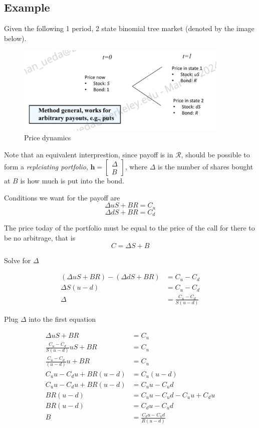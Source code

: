 \documentclass[11pt]{article}
\begin{document}
\subsection{Example}

Given the following 1 period, 2 state binomial tree market (denoted by the image below).

\begin{figure}[H] 
    \centering 
    \includegraphics[width=4in]{imgs/one_period_two_state_bin_tree_model.png}
    \caption{Price dynamics}
\end{figure}

Note that an equivalent interprestion, since payoff is in $\boldsymbol{\mathcal{R}}$, should be 
possible to form a \textit{replciating portfolio}, $\boldsymbol{h}= 
\begin{bmatrix}
    \Delta \\
    B
\end{bmatrix}$, where $\Delta$ is the number of shares bought at $B$ is how much is put into 
the bond.

Conditions we want for the payoff are
\[\Delta u S + B R = C_u\] 
\[\Delta d S + B R = C_d\]

The price today of the portfolio must be equal to the price of the call for there to be no 
arbitrage, that is
\[C = \Delta S + B \]

Solve for $\Delta$

\begin{align*}
    (\Delta u S + B R) - (\Delta d S + B R) &= C_u - C_d \\
    \Delta S (u-d) &= C_u - C_d \\ 
    \Delta &= \frac{C_u - C_d}{S (u-d)}
\end{align*}

Plug $\Delta$ into the first equation 

\begin{align*}
    \Delta u S + B R &= C_u \\
    \frac{C_u - C_d}{S (u-d)} u S + B R &= C_u \\
    \frac{C_u - C_d}{(u-d)} u + B R &= C_u \\
    C_u u- C_d u + B R(u-d) &= C_u(u-d) \\
    C_u u- C_d u + B R(u-d) &= C_u u - C_u d \\
    B R(u-d) &= C_u u - C_u d - C_u u + C_d u \\
    B R(u-d) &= C_d u- C_u d \\
    B &= \frac{C_d u- C_u d}{R(u-d)}
\end{align*}
\end{document}
